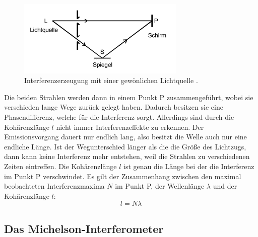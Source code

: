 \begin{figure}
    \centering
    \includegraphics[width=8cm]{data/abb1.png}
    \caption{Interferenzerzeugung mit einer gewönlichen Lichtquelle \cite{sample}.}
    \label{fig:abb1}
\end{figure}
\FloatBarrier
Die beiden Strahlen werden dann in einem Punkt P zusammengeführt, wobei sie verschieden lange Wege zurück gelegt haben.
Dadurch besitzen sie eine Phasendifferenz, welche für die Interferenz sorgt.
Allerdings sind durch die Kohärenzlänge $l$ nicht immer Interferenzeffekte zu erkennen.
Der Emissionsvorgang dauert nur endlich lang, also besitzt die Welle auch nur eine endliche Länge.
Ist der Wegunterschied länger als die die Größe des Lichtzugs, dann kann keine Interferenz mehr entstehen, weil die Strahlen zu verschiedenen Zeiten eintreffen.
Die Kohärenzlänge $l$ ist genau die Länge bei der die Interferenz im Punkt P verschwindet.
Es gilt der Zusammenhang zwischen den maximal beobachteten Interferenzmaxima $N$ im Punkt P, der Wellenlänge $\lambda$ und der Kohärenzlänge $l$:
\begin{equation}
    l = N \lambda
\end{equation}

\subsection{Das Michelson-Interferometer}
\label{sec:theo2}

